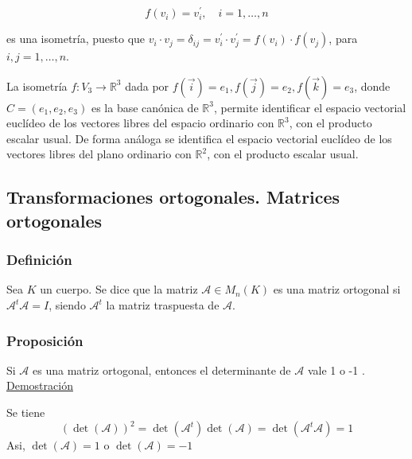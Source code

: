\documentclass[12pt, a4paper, ones, notitlepage, openany,titlepage]{article}
\newcommand{\demostracion}{\noindent\underline{Demostración}}
\begin{document}
$$
f\left(v_{i}\right)=v_{i}^{\prime}, \quad i=1, \ldots, n
$$

es una isometría, puesto que $v_{i} \cdot v_{j}=\delta_{i j}=v_{i}^{\prime} \cdot v_{j}^{\prime}=f\left(v_{i}\right) \cdot f\left(v_{j}\right)$, para $i, j=1, \ldots, n$.

La isometría $f: V_{3} \rightarrow \mathbb{R}^{3}$ dada por $f(\vec{i})=e_{1}, f(\vec{j})=e_{2}, f(\vec{k})=e_{3}$, donde $C=\left(e_{1}, e_{2}, e_{3}\right)$ es la base canónica de $\mathbb{R}^{3}$, permite identificar el espacio vectorial euclídeo de los vectores libres del espacio ordinario con $\mathbb{R}^{3}$, con el producto escalar usual. De forma análoga se identifica el espacio vectorial euclídeo de los vectores libres del plano ordinario con $\mathbb{R}^{2}$, con el producto escalar usual.

\subsection{Transformaciones ortogonales. Matrices ortogonales}
\subsubsection{Definición}
Sea $K$ un cuerpo. Se dice que la matriz $\mathcal{A} \in M_{n}(K)$ es una matriz ortogonal si $\mathcal{A}^{t} \mathcal{A}=I$, siendo $\mathcal{A}^{t}$ la matriz traspuesta de $\mathcal{A}$.

\subsubsection{Proposición}
Si $\mathcal{A}$ es una matriz ortogonal, entonces el determinante de $\mathcal{A}$ vale 1 o -1 .\\

\demostracion

\noindent Se tiene
$$
(\operatorname{det}(\mathcal{A}))^{2}=\operatorname{det}\left(\mathcal{A}^{t}\right) \operatorname{det}(\mathcal{A})=\operatorname{det}\left(\mathcal{A}^{t} \mathcal{A}\right)=1
$$
Asi, $\operatorname{det}(\mathcal{A})=1$ o $\operatorname{det}(\mathcal{A})=-1$
\end{document}
